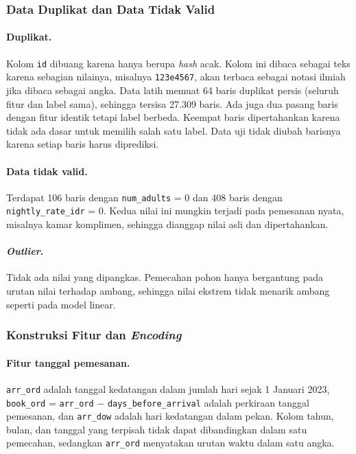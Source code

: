\subsubsection{Data Duplikat dan Data Tidak Valid}

\paragraph{Duplikat.} Kolom \texttt{id} dibuang karena hanya berupa \textit{hash} acak. Kolom ini
dibaca sebagai teks karena sebagian nilainya, misalnya \texttt{123e4567}, akan terbaca sebagai
notasi ilmiah jika dibaca sebagai angka. Data latih memuat 64 baris duplikat persis (seluruh fitur
dan label sama), sehingga tersisa 27.309 baris. Ada juga dua pasang baris dengan fitur identik
tetapi label berbeda. Keempat baris dipertahankan karena tidak ada dasar untuk memilih salah satu
label. Data uji tidak diubah barisnya karena setiap baris harus diprediksi.

\paragraph{Data tidak valid.} Terdapat 106 baris dengan \texttt{num\_adults} = 0 dan 408 baris
dengan \texttt{nightly\_rate\_idr} = 0. Kedua nilai ini mungkin terjadi pada pemesanan nyata, misalnya
kamar komplimen, sehingga dianggap nilai asli dan dipertahankan.

\paragraph{\textit{Outlier}.} Tidak ada nilai yang dipangkas. Pemecahan pohon hanya bergantung pada
urutan nilai terhadap ambang, sehingga nilai ekstrem tidak menarik ambang seperti pada model linear.

\subsubsection{Konstruksi Fitur dan \textit{Encoding}}

\paragraph{Fitur tanggal pemesanan.} \texttt{arr\_ord} adalah tanggal kedatangan dalam jumlah hari
sejak 1 Januari 2023, \texttt{book\_ord} = \texttt{arr\_ord} $-$ \texttt{days\_before\_arrival}
adalah perkiraan tanggal pemesanan, dan \texttt{arr\_dow} adalah hari kedatangan dalam pekan.
Kolom tahun, bulan, dan tanggal yang terpisah tidak dapat dibandingkan dalam satu pemecahan, sedangkan
\texttt{arr\_ord} menyatakan urutan waktu dalam satu angka.

